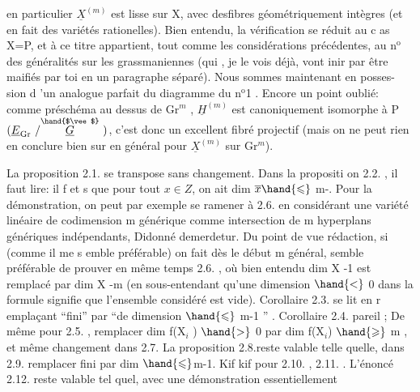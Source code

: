 
en particulier $\underline{X}^{(m)}$ est lisse sur X, avec des\hand{/}fibres géométriquement
intègres (et en fait des variétés rationelles). Bien entendu, la
vérification se réduit au c as X=P, et à ce titre appartient, tout
\margin{|}comme les considérations précédentes, au n$^{\text{o}}$ des généralités sur les
grassmaniennes (qui , je le vois déjà, vont inir par être maifiés
par toi en un paragraphe séparé). Nous sommes maintenant en posses-%
sion d 'un analogue parfait du diagramme du n$^{\text{o}}$1 . Encore un point
oublié: comme préschéma au dessus de Gr$^{m}$ , $\underline{H}^{(m)}$ est canoniquement
isomorphe à P$(\underline{E}_{\mathrm{Gr}}\ /\overset{\hand{$\vee$}}{\underline{G}}\ )$, c'est donc un excellent fibré projectif
(mais on ne peut rien en conclure bien sur en général pour $\underline{X}^{(m)}$ sur
Gr$^{m}$).

La proposition 2.1. se transpose sans changement. Dans la
propositi on 2.2. , il faut lire: il f et s que pour tout $x \in Z$, on
ait  dim $\overline{x} \hand{\leqslant}$ m-. Pour la démonstration, on peut par exemple
se ramener à 2.6. en considérant une  variété linéaire de
codimension m générique comme intersection de m hyperplans génériques
indépendants, Didonné demerdetur. Du point de vue rédaction, si
(comme il me s emble préférable) on fait dès le début m général, 
semble préférable de prouver en même temps 2.6. , où bien entendu
dim X -1 est remplacé par dim X -m (en sous-entendant qu'une dimension
$\hand{<}$ 0 dans la formule signifie que l'ensemble considéré est vide).
Corollaire 2.3. se lit en r emplaçant ``fini'' par ``de dimension $\hand{\leqslant}$ 
m-1 '' . Corollaire 2.4. pareil ; De même pour 2.5. , remplacer
dim f(X$_{i}$ ) $\hand{>}$ 0 par dim f(X$_{i}$) $\hand{\geqslant}$ m , et même changement dans 2.7.
La proposition 2.8.reste valable telle quelle, dans 2.9. remplacer
fini par dim $\hand{\leqslant}$m-1. Kif kif pour 2.10. , 2.11. . L'énoncé
2.12. reste valable tel quel, avec une démonstration essentiellement

